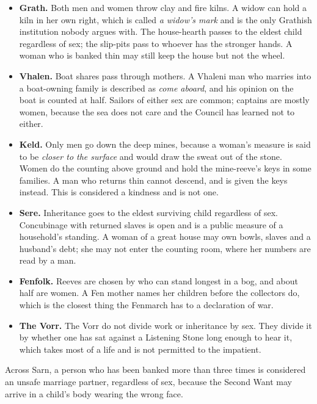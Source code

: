 \documentclass{design/chronicle}
\begin{document}
\begin{itemize}[leftmargin=1.4em,itemsep=1pt,topsep=3pt,parsep=0pt]

\item \textbf{Grath.} Both men and women throw clay and fire kilns. A widow can hold a kiln in her own right, which is called \emph{a widow’s mark} and is the only Grathish institution nobody argues with. The house-hearth passes to the eldest child regardless of sex; the slip-pits pass to whoever has the stronger hands. A woman who is banked thin may still keep the house but not the wheel.

\item \textbf{Vhalen.} Boat shares pass through mothers. A Vhaleni man who marries into a boat-owning family is described as \emph{come aboard}, and his opinion on the boat is counted at half. Sailors of either sex are common; captains are mostly women, because the sea does not care and the Council has learned not to either.

\item \textbf{Keld.} Only men go down the deep mines, because a woman’s measure is said to be \emph{closer to the surface} and would draw the sweat out of the stone. Women do the counting above ground and hold the mine-reeve’s keys in some families. A man who returns thin cannot descend, and is given the keys instead. This is considered a kindness and is not one.

\item \textbf{Sere.} Inheritance goes to the eldest surviving child regardless of sex. Concubinage with returned slaves is open and is a public measure of a household’s standing. A woman of a great house may own bowls, slaves and a husband’s debt; she may not enter the counting room, where her numbers are read by a man.

\item \textbf{Fenfolk.} Reeves are chosen by who can stand longest in a bog, and about half are women. A Fen mother names her children before the collectors do, which is the closest thing the Fenmarch has to a declaration of war.

\item \textbf{The Vorr.} The Vorr do not divide work or inheritance by sex. They divide it by whether one has sat against a Listening Stone long enough to hear it, which takes most of a life and is not permitted to the impatient.

\end{itemize}

Across Sarn, a person who has been banked more than three times is considered an unsafe marriage partner, regardless of sex, because the Second Want may arrive in a child’s body wearing the wrong face.
\end{document}
